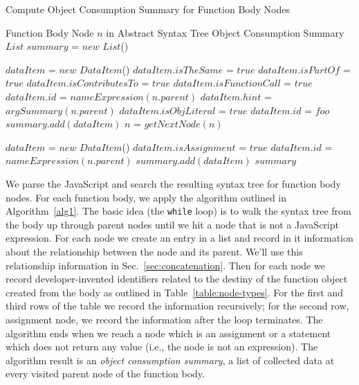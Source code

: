\documentclass[10pt, preprint]{sigplanconf}
\begin{document}
\renewcommand{\algorithmicrequire}{\textbf{Input:}}
\renewcommand{\algorithmicensure}{\textbf{Output:}}

\begin{algorithm}                      %
\caption{Compute Object Consumption Summary for Function Body Nodes}          %
\label{alg1}                           %
\begin{algorithmic}                    %
\REQUIRE Function Body Node $n$ in Abstract Syntax Tree
\ENSURE Object Consumption Summary 
\STATE $List$ $summary$ = $new$ $List$()


	\STATE $dataItem$ = $new$ $DataItem$()
    	 \STATE $dataItem.isTheSame$ = $true$
    		\STATE $dataItem.isPartOf$ = $true$
    \ELSE	
	   		\STATE $dataItem.isContributesTo$ = $true$
    \ENDIF
   	    \STATE $dataItem.isFunctionCall$ = $true$
   	    \STATE $dataItem.id$ = $nameExpression(n.parent)$
   	    \STATE $dataItem.hint$ = $argSummary(n.parent)$
   	    \STATE $dataItem.isObjLiteral$ = $true$
   	    \STATE $dataItem.id$ = $foo$
    \ENDIF     
   \STATE $summary.add(dataItem)$
   \STATE $n$ = $getNextNode(n)$
\ENDWHILE 
 
  	\STATE $dataItem$ = $new$ $DataItem$()
		\STATE $dataItem.isAssignment$ = $true$
    \STATE $dataItem.id$ = $nameExpression(n.parent)$
    \STATE $summary.add(dataItem)$
  \ENDIF	
  \RETURN $summary$
\end{algorithmic}
\end{algorithm}

We parse the JavaScript and search the resulting syntax tree for function body nodes. For each function body, we apply the algorithm outlined in Algorithm~\ref{alg1}. The basic idea (the \verb|while| loop) is to walk the syntax tree from the body up through parent nodes until we hit a node that is not a JavaScript expression. For each node we create an entry in a list and record in it information about the relationship between the node and its parent. We'll use this relationship information in Sec.~\ref{sec:concatenation}. Then for each node  we record developer-invented identifiers related to the destiny of the function object created from the body as outlined in  Table~\ref{table:node-types}. For the first and third rows of the table we record the information recursively; for the second row,  assignment node, we record the information after the loop terminates.   The algorithm ends when we reach a node which is an assignment or a statement which does not return any value (i.e., the node is not an expression).  The algorithm result is an \textit{object consumption summary}, a list of collected data at every visited parent node of the function body.
\end{document}
